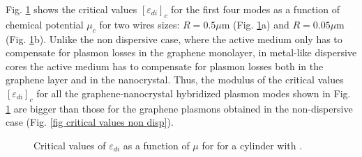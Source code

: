 \documentclass[9pt,twocolumn,twoside]{osajnl}
\begin{document}
Fig. \ref{fig critical values disp} shows the critical values $[\varepsilon_{di}]_c $ for the first four modes as a function of chemical potential $\mu_c$ for two wires sizes: $R=0.5\mu$m (Fig. \ref{fig critical values disp}a) and $R=0.05\mu$m (Fig. \ref{fig critical values disp}b). 
%
Unlike the non dispersive case, where the active medium only has to compensate for plasmon losses in the graphene monolayer, in metal-like dispersive cores the active medium has to compensate for plasmon losses both in the graphene layer and in the nanocrystal. Thus, the modulus of the critical values $[\varepsilon_{di}]_c $ for all the graphene-nanocrystal hybridized plasmon modes shown in Fig. \ref{fig critical values disp} are bigger 
than those for the graphene plasmons obtained in the non-dispersive case (Fig. \ref{fig critical values non disp}). 
\begin{figure}[ht!]
\centering
\captionsetup[subfigure]{justification=centering}
\newline
\captionsetup[subfigure]{justification=centering}
\caption{Critical values of $\varepsilon_{di}$ as a function of $\mu$ for for a cylinder with \twoDisp. 
}
\label{fig critical values disp}
\end{figure}
%
\end{document}
